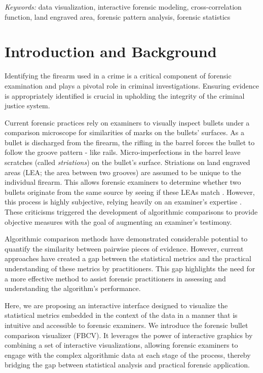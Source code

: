 \documentclass[
  12pt]{article}
\begin{document}
\noindent%
{\it Keywords:} data visualization, interactive forensic
modeling, cross-correlation function, land engraved area, forensic
pattern analysis, forensic statistics
\vfill

\newpage
{} %


\section{Introduction and Background}\label{sec-intro}

Identifying the firearm used in a crime is a critical component of
forensic examination and plays a pivotal role in criminal
investigations. Ensuring evidence is appropriately identified is crucial
in upholding the integrity of the criminal justice system.

Current forensic practices rely on examiners to visually inspect bullets
under a comparison microscope for similarities of marks on the bullets'
surfaces. As a bullet is discharged from the firearm, the rifling in the
barrel forces the bullet to follow the groove pattern - like rails.
Micro-imperfections in the barrel leave scratches (called
\emph{striations}) on the bullet's surface. Striations on land engraved
areas (LEA; the area between two grooves) are assumed to be unique to
the individual firearm. This allows forensic examiners to determine
whether two bullets originate from the same source by seeing if these
LEAs match \citep{afte}. However, this process is highly subjective,
relying heavily on an examiner's expertise \citep{nas2009, pcast}. These
criticisms triggered the development of algorithmic comparisons
\citep{carriquiryMachineLearningForensic2019, chenFiredBulletSignature2019, chuAutomaticIdentificationBullet2013, juOpenSourceImplementationCMPS2022, vorburgerApplicationsCrosscorrelationFunctions2011, vorburgerTopographyMeasurementsApplications2015}
to provide objective measures with the goal of augmenting an examiner's
testimony.

Algorithmic comparison methods have demonstrated considerable potential
to quantify the similarity between pairwise pieces of evidence. However,
current approaches have created a gap between the statistical metrics
and the practical understanding of these metrics by practitioners. This
gap highlights the need for a more effective method to assist forensic
practitioners in assessing and understanding the algorithm's
performance.

Here, we are proposing an interactive interface designed to visualize
the statistical metrics embedded in the context of the data
\citep{wickhamVisualizingStatisticalModels2015} in a manner that is
intuitive and accessible to forensic examiners. We introduce the
forensic bullet comparison visualizer (FBCV). It leverages the power of
interactive graphics by combining a set of interactive visualizations,
allowing forensic examiners to engage with the complex algorithmic data
at each stage of the process, thereby bridging the gap between
statistical analysis and practical forensic application.
\end{document}
